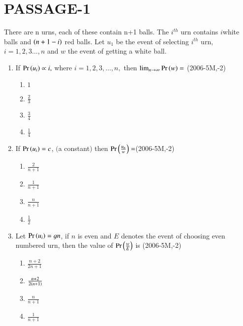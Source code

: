 \documentclass[journal,12pt,onecolumn,article]{IEEEtran}
\theoremstyle{remark}
\begin{document}
\section*{PASSAGE-1}
There are n urns, each of these contain n+1 balls. The $i^{th}$ urn contains $i$white balls and $\left(n+1-i\right)$ red balls. Let $u_1$ be the event of selecting $i^{th}$ urn, $i=1,2,3\dots,n$ and $w$ the event of getting a white ball.
\begin{enumerate}
	\item If $\Pr\left(u_i\right)\propto i,$ where $i=1,2,3,\dots,n,$ then $\lim_{n \to \infty} \Pr\left(w\right)=$ \hfill(2006-5M,-2)
		\begin{enumerate}
					\item $1$
					\item $\frac{2}{3}$
					\item $\frac{3}{4}$
					\item $\frac{1}{4}$
		\end{enumerate}
	\item If $\Pr\left(u_i\right)=c$, $($a constant$)$ then $\Pr\left(\frac{u_n}{w}\right)=$\hfill(2006-5M,-2)
		\begin{enumerate}
				\item $\frac{2}{n+1}$
				\item $\frac{1}{n+1}$
				\item $\frac{n}{n+1}$
				\item $\frac{1}{2}$
		\end{enumerate}
	\item Let $\Pr\left(u_i\right)=\frak{1}{n}$, if $n$ is even and $E$ denotes the event of choosing even numbered urn, then the value of $\Pr\left(\frac{w}{E}\right)$ is \hfill(2006-5M,-2)
		\begin{enumerate}
				\item $\frac{n+2}{2n+1}$
				\item $\frac{n+2}{2\left(n+1\right)}$
				\item $\frac{n}{n+1}$
				\item $\frac{1}{n+1}$
		\end{enumerate}

\end{enumerate}
\end{document}

